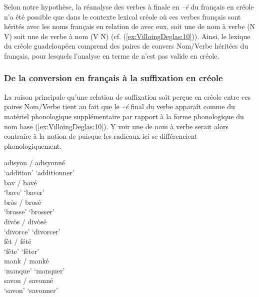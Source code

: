 \documentclass[output=paper]{langsci/langscibook}
\begin{document}
Selon notre hypothèse, la réanalyse des verbes à finale en \emph{--é} du
français en créole n'a été possible que dans le contexte lexical créole
où ces verbes français sont hérités avec les noms français en relation
de  avec eux, soit une  de nom à verbe (N\textrightarrow{~} V) soit
une  de verbe à nom (V\textrightarrow{~} N) (cf. (\ref{ex:VilloingDeglas:10})). Ainsi, le lexique du
créole guadeloupéen comprend des paires de convers Nom/Verbe héritées du
français, pour lesquels l'analyse en terme de  n'est pas
valide en créole.

\subsubsection{De la conversion en français à la suffixation en
créole}\label{subsubsection:VilloingDeglas:de-la-conversion-en-français-uxe0-la-suffixation-en-créole}

La raison principale qu'une relation de suffixation soit perçue en
créole entre ces paires Nom/Verbe tient au fait que le --\emph{é}
final du verbe apparaît comme du matériel phonologique supplémentaire
par rapport à la forme phonologique du nom base (\ref{ex:VilloingDeglas:10}). Y voir une
 de nom à verbe serait alors contraire à la notion de
 puisque les radicaux ici se différencient phonologiquement.


\ea\label{ex:VilloingDeglas:10}
  \ea \gll adisyon / adisyonné\\
  {`addition'} {} {`additionner'}\\
  \ex \gll bav / bavé\\
  {`bave'} {} {`baver'}\\
  \ex \gll bròs / brosé\\
  {`brosse'} {} {`brosser'}\\
  \ex \gll divòs / divòsé\\
  {`divorce'} {} {`divorcer'}\\
  \ex \gll fèt / fété\\
  {`fête'} {} {`fêter'}\\
  \ex \gll mank / manké\\
  {`manque'} {} {`manquer'}\\
  \ex \gll savon / savonné\\
  {`savon'} {} {`savonner'}\\
\z\z
\end{document}
